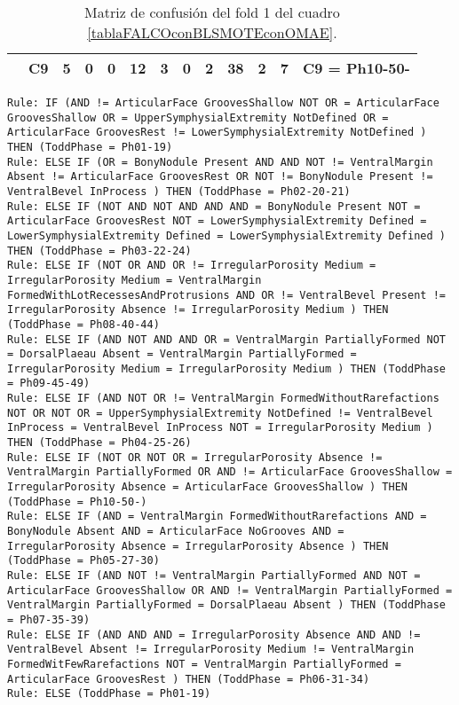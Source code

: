 \begin{table}[H]
{\begin{tabular}{|ccrrrrrrrrrrc|}
\multicolumn{1}{|c|}{}                                      & \multicolumn{1}{c|}{C9} & \multicolumn{1}{c|}{\textbf{5}}  & \multicolumn{1}{c|}{0}  & \multicolumn{1}{c|}{0}  & \multicolumn{1}{c|}{\textbf{12}} & \multicolumn{1}{c|}{\textbf{3}}  & \multicolumn{1}{c|}{0}  & \multicolumn{1}{c|}{\textbf{2}}  & \multicolumn{1}{c|}{\textbf{38}} & \multicolumn{1}{c|}{\textbf{2}}  & \multicolumn{1}{c|}{\textbf{7}}  & C9 = Ph10-50-     \\ \hline
\end{tabular}%
}
\caption{Matriz de confusión del fold 1 del cuadro \ref{tablaFALCOconBLSMOTEconOMAE}.}

\end{table}

\begin{lstlisting}
Rule: IF (AND != ArticularFace GroovesShallow NOT OR = ArticularFace GroovesShallow OR = UpperSymphysialExtremity NotDefined OR = ArticularFace GroovesRest != LowerSymphysialExtremity NotDefined ) THEN (ToddPhase = Ph01-19)
Rule: ELSE IF (OR = BonyNodule Present AND AND NOT != VentralMargin Absent != ArticularFace GroovesRest OR NOT != BonyNodule Present != VentralBevel InProcess ) THEN (ToddPhase = Ph02-20-21)
Rule: ELSE IF (NOT AND NOT AND AND AND = BonyNodule Present NOT = ArticularFace GroovesRest NOT = LowerSymphysialExtremity Defined = LowerSymphysialExtremity Defined = LowerSymphysialExtremity Defined ) THEN (ToddPhase = Ph03-22-24)
Rule: ELSE IF (NOT OR AND OR != IrregularPorosity Medium = IrregularPorosity Medium = VentralMargin FormedWithLotRecessesAndProtrusions AND OR != VentralBevel Present != IrregularPorosity Absence != IrregularPorosity Medium ) THEN (ToddPhase = Ph08-40-44)
Rule: ELSE IF (AND NOT AND AND OR = VentralMargin PartiallyFormed NOT = DorsalPlaeau Absent = VentralMargin PartiallyFormed = IrregularPorosity Medium = IrregularPorosity Medium ) THEN (ToddPhase = Ph09-45-49)
Rule: ELSE IF (AND NOT OR != VentralMargin FormedWithoutRarefactions NOT OR NOT OR = UpperSymphysialExtremity NotDefined != VentralBevel InProcess = VentralBevel InProcess NOT = IrregularPorosity Medium ) THEN (ToddPhase = Ph04-25-26)
Rule: ELSE IF (NOT OR NOT OR = IrregularPorosity Absence != VentralMargin PartiallyFormed OR AND != ArticularFace GroovesShallow = IrregularPorosity Absence = ArticularFace GroovesShallow ) THEN (ToddPhase = Ph10-50-)
Rule: ELSE IF (AND = VentralMargin FormedWithoutRarefactions AND = BonyNodule Absent AND = ArticularFace NoGrooves AND = IrregularPorosity Absence = IrregularPorosity Absence ) THEN (ToddPhase = Ph05-27-30)
Rule: ELSE IF (AND NOT != VentralMargin PartiallyFormed AND NOT = ArticularFace GroovesShallow OR AND != VentralMargin PartiallyFormed = VentralMargin PartiallyFormed = DorsalPlaeau Absent ) THEN (ToddPhase = Ph07-35-39)
Rule: ELSE IF (AND AND AND = IrregularPorosity Absence AND AND != VentralBevel Absent != IrregularPorosity Medium != VentralMargin FormedWitFewRarefactions NOT = VentralMargin PartiallyFormed = ArticularFace GroovesRest ) THEN (ToddPhase = Ph06-31-34)
Rule: ELSE (ToddPhase = Ph01-19)
\end{lstlisting}






